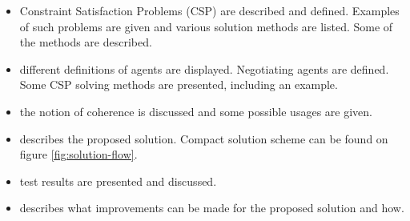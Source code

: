 \documentclass[header]{subfiles}
\begin{document}
\begin{itemize}[leftmargin=2.5cm]
  \item[\inChapter{csp}]
        Constraint Satisfaction Problems (CSP) are described and defined.
        Examples of such problems are given and various solution methods are
        listed. Some of the methods are described.
  \item[\inChapter{agents}]
        different definitions of agents are displayed. Negotiating agents are
        defined. Some CSP solving methods are presented, including an example.
  \item[\inChapter{Coherence}]
        the notion of coherence is discussed and some possible usages are given.
  \item[\showChapter{solution}]
        describes the proposed solution. Compact solution scheme can be found
        on figure \ref{fig:solution-flow}.
  \item[\inChapter{test}] test results are presented and discussed.
  \item[\showChapter{improvements}]
        describes what improvements can be made for the proposed solution and
        how.

\end{itemize}

\end{document}
